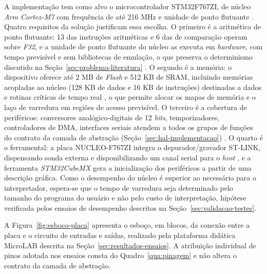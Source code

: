 A implementação tem como alvo o microcontrolador STM32F767ZI, de núcleo \textit{Arm Cortex-M7} com frequência de até 216 MHz e unidade de ponto flutuante \cite{st:ds11532}.
Quatro requisitos da solução justificam essa escolha.
O primeiro é a aritmética de ponto flutuante: 13 das instruções aritméticas e 6 das de comparação operam sobre \textit{F32}, e a unidade de ponto flutuante do núcleo as executa em \textit{hardware}, com tempo previsível e sem bibliotecas de emulação, o que preserva o determinismo discutido na Seção~\ref{sec:problema-literatura} \cite{liu:2000}.
O segundo é a memória: o dispositivo oferece até 2 MB de \textit{Flash} e 512 KB de SRAM, incluindo memórias acopladas ao núcleo (128 KB de dados e 16 KB de instruções) destinadas a dados e rotinas críticas de tempo real \cite{st:ds11532}, o que permite alocar os mapas de memória e o laço de varredura em regiões de acesso previsível.
O terceiro é a cobertura de periféricos: conversores analógico-digitais de 12 \textit{bits}, temporizadores, controladores de DMA, interfaces seriais atendem a todos os grupos de funções do contrato da camada de abstração (Seção~\ref{sec:hal-implementacao}) \cite{st:ds11532,st:rm0410}.
O quarto é o ferramental: a placa NUCLEO-F767ZI integra o depurador/gravador ST-LINK, dispensando sonda externa e disponibilizando um canal serial para o \textit{host} \cite{st:um1974}, e a ferramenta \textit{STM32CubeMX} gera a inicialização dos periféricos a partir de uma descrição gráfica.
Como o desempenho do núcleo é superior ao necessário para o interpretador, espera-se que o tempo de varredura seja determinado pelo tamanho do programa do usuário e não pelo custo de interpretação, hipótese verificada pelos ensaios de desempenho descritos na Seção~\ref{sec:validacao-testes}.

A Figura~\ref{fig:esboco-placa} apresenta o esboço, em blocos, da conexão entre a placa e o circuito de entradas e saídas, realizado pela plataforma didática MicroLAB descrita na Seção~\ref{sec:resultados-ensaios}.
A atribuição individual de pinos adotada nos ensaios consta do Quadro~\ref{qua:pinagem} e não altera o contrato da camada de abstração.


